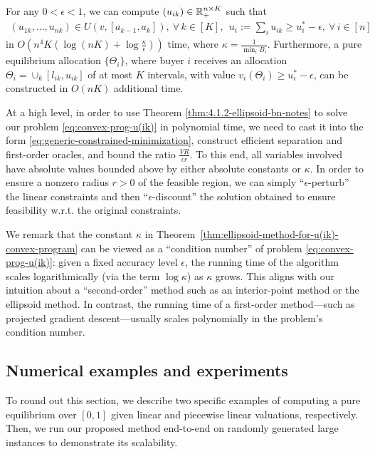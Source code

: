 \begin{theorem}
	For any $0 < \epsilon < 1$, we can compute $(u_{ik})\in \mathbb{R}_+^{n\times K}$ such that 
	\begin{align*}
		(u_{1k}, \dots, u_{nk})\in U(v, [a_{k-1}, a_k]),\ \forall\, k\in [K], \ \  u_i := \sum_i u_{ik} \geq u^*_i - \epsilon, \ \forall\, i \in [n]
	\end{align*}
	in $O\left( n^4 K \left( \log(nK) + \log \frac{\kappa}{\epsilon} \right) \right)$ time, where $\kappa = \frac{1}{\min_i B_i}$.
	Furthermore, a pure equilibrium allocation $\{\Theta_i\}$, where buyer $i$ receives an allocation $\Theta_i = \cup_k [l_{ik}, u_{ik}]$ of at most $K$ intervals,
	with value $v_i(\Theta_i) \geq u^*_i - \epsilon$,
	can be constructed in $O(nK)$ additional time. 
	\label{thm:ellipsoid-method-for-u(ik)-convex-program}
\end{theorem}
At a high level, in order to use Theorem \ref{thm:4.1.2-ellipsoid-bn-notes} to solve our problem \eqref{eq:convex-prog-u(ik)} in polynomial time, we need to cast it into the form \eqref{eq:generic-constrained-minimization}, construct efficient separation and first-order oracles, and bound the ratio $\frac{VR}{\epsilon r}$. To this end, all variables involved have absolute values bounded above by either absolute constants or $\kappa$. In order to ensure a nonzero radius $r>0$ of the feasible region, we can simply ``$\epsilon$-perturb'' the linear constraints and then ``$\epsilon$-discount'' the solution obtained to ensure feasibility w.r.t. the original constraints.

We remark that the constant $\kappa$ in Theorem~\ref{thm:ellipsoid-method-for-u(ik)-convex-program} can be viewed as a ``condition number'' of problem \eqref{eq:convex-prog-u(ik)}: given a fixed accuracy level $\epsilon$, the running time of the algorithm scales logarithmically (via the term $\log \kappa$) as $\kappa$ grows. 
This aligns with our intuition about a ``second-order'' method such as an interior-point method or the ellipsoid method. 
In contrast, the running time of a first-order method---such as projected gradient descent---usually scales polynomially in the problem's condition number.

\subsection{Numerical examples and experiments} \label{subsec:numerical-examples}
To round out this section, we describe two specific examples of computing a pure equilibrium over $[0,1]$ given linear and piecewise linear valuations, respectively. 
Then, we run our proposed method end-to-end on randomly generated large instances to demonstrate its scalability. 

